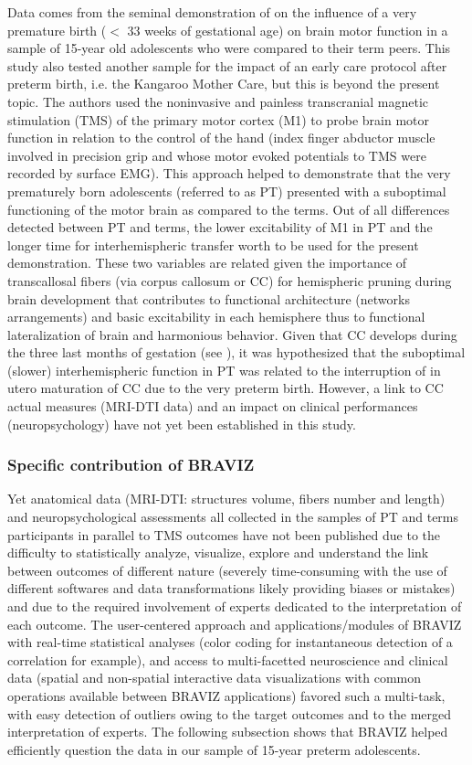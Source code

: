 \documentclass[twocolumn]{svjour3}
\begin{document}
Data comes from the seminal demonstration of \cite{schneider_cerebral_2012} on the influence of a very premature birth ($<$ 33 weeks of gestational age) on brain motor function in a sample of 15-year old adolescents who were compared to their term peers. This study also tested another sample for the impact of an early care protocol after preterm birth, i.e. the Kangaroo Mother Care, but this is beyond the present topic. The authors used the noninvasive and painless transcranial magnetic stimulation (TMS) of the primary motor cortex (M1) to probe brain motor function in relation to the control of the hand (index finger abductor muscle involved in precision grip and whose motor evoked potentials to TMS were recorded by surface EMG). This approach helped to demonstrate that the very prematurely born adolescents (referred to as PT) presented with a suboptimal functioning of the motor brain as compared to the terms. Out of all differences detected between PT and terms, the lower excitability of M1 in PT and the longer time for interhemispheric transfer worth to be used for the present demonstration. These two variables are related given the importance of transcallosal fibers (via corpus callosum or CC) for hemispheric pruning during brain development that contributes to functional architecture (networks arrangements) and basic excitability in each hemisphere thus to functional lateralization of brain and harmonious behavior. Given that CC develops during the three last months of gestation (see \cite{schneider_cerebral_2012}), it was hypothesized that the suboptimal (slower) interhemispheric function in PT was related to the interruption of in utero maturation of CC due to the very preterm birth. However, a link to CC actual measures (MRI-DTI data) and an impact on clinical performances (neuropsychology) have not yet been established in this study.


\subsubsection{Specific contribution of BRAVIZ}

Yet anatomical data (MRI-DTI: structures volume, fibers number and length) and neuropsychological assessments all collected in the samples of PT and terms participants in parallel to TMS outcomes have not been published due to the difficulty to statistically analyze, visualize, explore and understand the link between outcomes of different nature (severely time-consuming with the use of different softwares and data transformations likely providing biases or mistakes) and due to the required involvement of experts dedicated to the interpretation of each outcome. The user-centered approach and applications/modules of BRAVIZ with real-time statistical analyses (color coding for instantaneous detection of a correlation for example), and access to multi-facetted neuroscience and clinical data (spatial and non-spatial interactive data visualizations with common operations available between BRAVIZ applications) favored such a multi-task, with easy detection of outliers owing to the target outcomes and to the merged interpretation of experts. The following subsection shows that BRAVIZ helped efficiently question the data in our sample of 15-year preterm adolescents.
\end{document}
